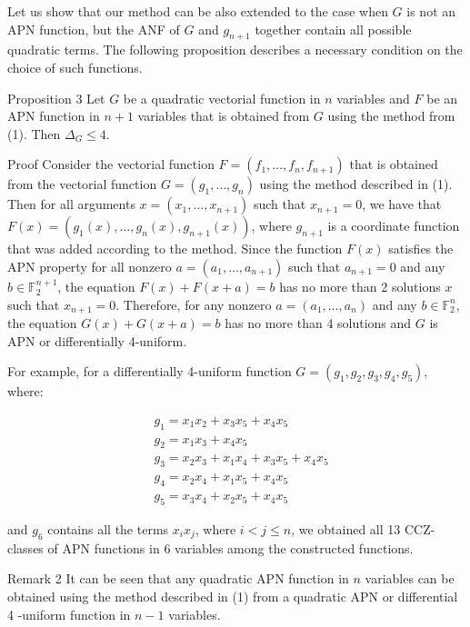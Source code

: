 \documentclass[10pt]{article}
\begin{document}
Let us show that our method can be also extended to the case when $G$ is not an APN function, but the ANF of $G$ and $g_{n+1}$ together contain all possible quadratic terms. The following proposition describes a necessary condition on the choice of such functions.

Proposition 3 Let $G$ be a quadratic vectorial function in $n$ variables and $F$ be an APN function in $n+1$ variables that is obtained from $G$ using the method from (1). Then $\Delta_{G} \leqslant 4$.

Proof Consider the vectorial function $F=\left(f_{1}, \ldots, f_{n}, f_{n+1}\right)$ that is obtained from the vectorial function $G=\left(g_{1}, \ldots, g_{n}\right)$ using the method described in (1). Then for all arguments $x=\left(x_{1}, \ldots, x_{n+1}\right)$ such that $x_{n+1}=0$, we have that $F(x)=\left(g_{1}(x), \ldots, g_{n}(x), g_{n+1}(x)\right)$, where $g_{n+1}$ is a coordinate function that was added according to the method. Since the function $F(x)$ satisfies the APN property for all nonzero $a=\left(a_{1}, \ldots, a_{n+1}\right)$ such that $a_{n+1}=0$ and any $b \in \mathbb{F}_{2}^{n+1}$, the equation $F(x)+F(x+a)=b$ has no more than 2 solutions $x$ such that $x_{n+1}=0$. Therefore, for any nonzero $a=\left(a_{1}, \ldots, a_{n}\right)$ and any $b \in \mathbb{F}_{2}^{n}$, the equation $G(x)+G(x+a)=b$ has no more than 4 solutions and $G$ is APN or differentially 4-uniform.

For example, for a differentially 4-uniform function $G=\left(g_{1}, g_{2}, g_{3}, g_{4}, g_{5}\right)$, where:

$$
\begin{aligned}
& g_{1}=x_{1} x_{2}+x_{3} x_{5}+x_{4} x_{5} \\
& g_{2}=x_{1} x_{3}+x_{4} x_{5} \\
& g_{3}=x_{2} x_{3}+x_{1} x_{4}+x_{3} x_{5}+x_{4} x_{5} \\
& g_{4}=x_{2} x_{4}+x_{1} x_{5}+x_{4} x_{5} \\
& g_{5}=x_{3} x_{4}+x_{2} x_{5}+x_{4} x_{5}
\end{aligned}
$$

and $g_{6}$ contains all the terms $x_{i} x_{j}$, where $i<j \leqslant n$, we obtained all 13 CCZ-classes of APN functions in 6 variables among the constructed functions.

Remark 2 It can be seen that any quadratic APN function in $n$ variables can be obtained using the method described in (1) from a quadratic APN or differential 4 -uniform function in $n-1$ variables.
\end{document}
